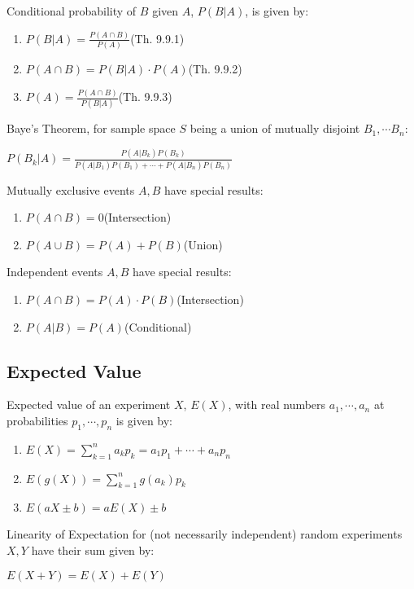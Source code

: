 \documentclass[12pt, a4paper]{article}
\begin{document}
\begin{multicols*}{3}
Conditional probability of $B$ given $A$, $P(B|A)$, is given by:
\begin{enumerate}[\roman*.]
  \item $P(B|A) = \displaystyle\frac{P(A\cap B)}{P(A)}$\hfill(Th. 9.9.1)
  \item $P(A\cap B) = P(B|A) \cdot P(A)$\hfill(Th. 9.9.2)
  \item $P(A) = \displaystyle\frac{P(A\cap B)}{P(B|A)}$\hfill(Th. 9.9.3)
\end{enumerate}

Baye's Theorem, for sample space $S$ being a union of mutually disjoint $B_1, \cdots B_n$:\\
{\centering
  $\displaystyle P(B_k|A) = \frac{P(A|B_k)P(B_k)}{P(A|B_1)P(B_1) + \cdots + P(A|B_n)P(B_n)}$
\par}
Mutually exclusive events $A,B$ have special results:
\begin{enumerate}[\roman*.]
  \item $P(A\cap B) = 0$\hfill(Intersection)
  \item $P(A\cup B) = P(A) + P(B)$\hfill(Union)
\end{enumerate}

Independent events $A,B$ have special results:
\begin{enumerate}[\roman*.]
  \item $P(A\cap B) = P(A)\cdot P(B)$\hfill(Intersection)
  \item $P(A|B) = P(A)$\hfill(Conditional)
\end{enumerate}
\subsection{Expected Value}
Expected value of an experiment $X$, $E(X)$, with real numbers $a_1,\cdots,a_n$ at probabilities $p_1,\cdots,p_n$ is given by:
\begin{enumerate}[\roman*.]
  \item $E(X) = \displaystyle\sum^n_{k=1} a_kp_k = a_1p_1 + \cdots + a_np_n$
  \item $E(g(X)) = \displaystyle \sum^n_{k=1} g(a_k)p_k$
  \item $E(aX\pm b) = aE(X)\pm b$
\end{enumerate}

Linearity of Expectation for (not necessarily independent) random experiments $X, Y$ have their sum given by:\\
{\centering
  $E(X+Y) = E(X) + E(Y)$
\par}


\end{multicols*}
\end{document}
